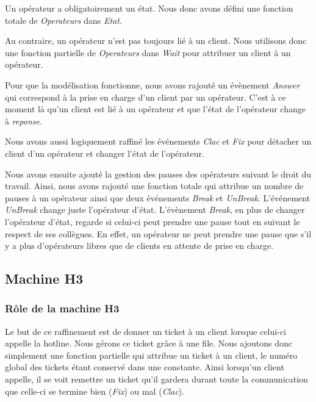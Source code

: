 \documentclass{article}
\begin{document}
   \indent Un opérateur a obligatoirement un état. Nous donc avons défini une
   fonction totale de \emph{Operateurs} dans \emph{Etat}.\newline
   
   \indent Au contraire, un opérateur n'est pas toujours lié à un
   client. Nous utilisons donc une fonction partielle de
   \emph{Operateurs} dans \emph{Wait} pour attribuer un client à un
   opérateur. \newline 

   \indent Pour que la modélisation fonctionne, nous avons rajouté un
   évènement \emph{Answer} qui correspond à la prise en charge d'un
   client par un opérateur. C'est à ce moment là qu'un client est lié à
   un opérateur et que l'état de l'opérateur change à
   \emph{reponse}.\newline

   \indent Nous avons aussi logiquement raffiné les événements
   \emph{Clac} et \emph{Fix} pour détacher un client d'un opérateur et
   changer l'état de l'opérateur. \newline 

   \indent Nous avons ensuite ajouté la gestion des pauses des
   opérateurs suivant le droit du travail. Ainsi, nous avons rajouté une
   fonction totale qui attribue un nombre de pauses à un opérateur ainsi
   que deux événements \emph{Break} et \emph{UnBreak}. L'événement
   \emph{UnBreak} change juste l'opérateur d'état. L'évènement
   \emph{Break}, en plus de changer l'opérateur d'état, regarde si
   celui-ci peut prendre une pause tout en suivant le respect de ses 
   collègues. En effet, un opérateur ne peut prendre une pause que s'il
   y a plus d'opérateurs libres que de clients en attente de prise en
   charge.

   

  \subsection{Machine H3}
  
   \subsubsection{Rôle de la machine H3}
   Le but de ce raffinement est de donner un ticket à un client lorsque
   celui-ci appelle la hotline. Nous gérons ce ticket grâce à une
   file. Nous ajoutons donc simplement une fonction partielle qui
   attribue un ticket à un client, le numéro global des tickets étant
   conservé dans une constante. Ainsi lorsqu'un client appelle, il se
   voit remettre un ticket qu'il gardera durant toute la communication
   que celle-ci se termine bien (\emph{Fix}) ou mal (\emph{Clac}).
\end{document}
